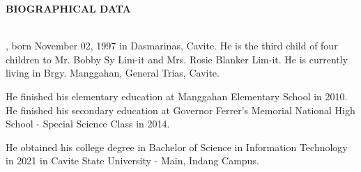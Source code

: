 \begin{doublespace}
	\thispagestyle{empty}

	\begin{center}
		\textbf{BIOGRAPHICAL DATA}
	\end{center}
	\leavevmode\\

	\justify
	\textbf{}, born November 02, 1997 in Dasmarinas, Cavite.
	He is the third child of four children to Mr. Bobby Sy Lim-it and Mrs.
	Rosie Blanker Lim-it. He is currently living in Brgy. Manggahan, General
	Trias, Cavite.

	\parx
	He finished his elementary education at Manggahan Elementary School in 2010.
	He finished his secondary education at Governor Ferrer's Memorial National
	High School - Special Science Class in 2014.

	\parx
	He obtained his college degree in Bachelor of Science in Information Technology
	in 2021 in Cavite State University - Main, Indang Campus.
\end{doublespace}
